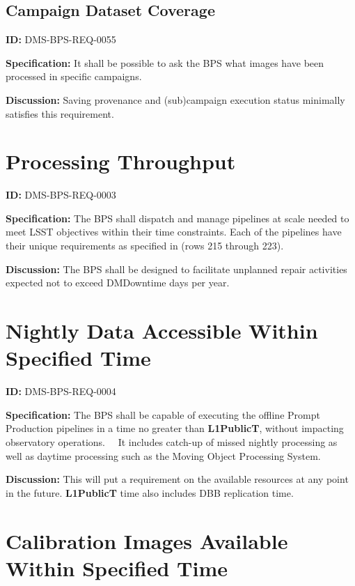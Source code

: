 \documentclass[SE,toc,lsstdraft]{lsstdoc}
\begin{document}
\subsection{Campaign Dataset Coverage}

\label{DMS-BPS-REQ-0055}
\textbf{ID:} DMS-BPS-REQ-0055

\textbf{Specification:}
It shall be possible to ask the BPS what images have been processed in specific campaigns.

\textbf{Discussion:}
Saving provenance and (sub)campaign execution status minimally satisfies this requirement.

\section{Processing Throughput}

\label{DMS-BPS-REQ-0003}
\textbf{ID:} DMS-BPS-REQ-0003

\textbf{Specification:}
The BPS shall dispatch and manage pipelines at scale needed to meet LSST objectives within their time constraints. Each of the pipelines have their unique requirements as specified in  (rows 215 through 223).

\textbf{Discussion:}
The BPS shall be designed to facilitate unplanned repair activities expected not to exceed DMDowntime days per year.

\section{Nightly Data Accessible Within Specified Time}

\label{DMS-BPS-REQ-0004}
\textbf{ID:} DMS-BPS-REQ-0004

\textbf{Specification:}
The BPS shall be capable of executing the offline Prompt Production pipelines in a time no greater than \textbf{L1PublicT}, without impacting observatory operations.   It includes catch-up of missed nightly processing as well as daytime processing such as the Moving Object Processing System.

\textbf{Discussion:}
This will put a requirement on the available resources at any point in the future. \textbf{L1PublicT} time also includes DBB replication time.

\section{Calibration Images Available Within Specified Time}
\end{document}
